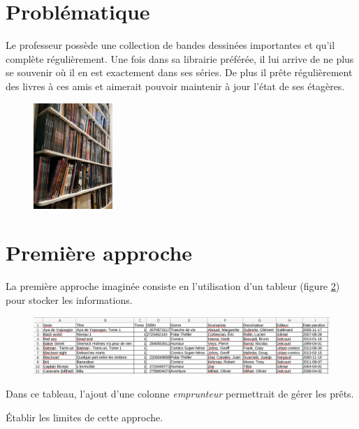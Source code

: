 \documentclass[a4paper,11pt]{article}
\begin{document}
\begin{Form}
\section{Problématique}
Le professeur possède une collection de bandes dessinées importantes et qu'il complète régulièrement. Une fois dans sa librairie préférée, il lui arrive de ne plus se souvenir où il en est exactement dans ses séries. De plus il prête régulièrement des livres à ces amis et aimerait pouvoir maintenir à jour l'état de ses étagères.
\begin{figure}[!h]
\centering
\includegraphics[width=3cm]{ressources/biblio.jpg}
\label{biblio}
\end{figure}

\begin{center}
\end{center}
\section{Première approche}
La première approche imaginée consiste en l'utilisation d'un tableur (figure \ref{tableur}) pour stocker les informations.
\begin{figure}[!h]
\centering
\includegraphics[width=15cm]{ressources/approche-1.png}
\label{tableur}
\end{figure}

Dans ce tableau, l'ajout d'une colonne \emph{emprunteur} permettrait de gérer les prêts.
\begin{activite}
Établir les limites de cette approche.
\end{activite}

\end{Form}
\end{document}
